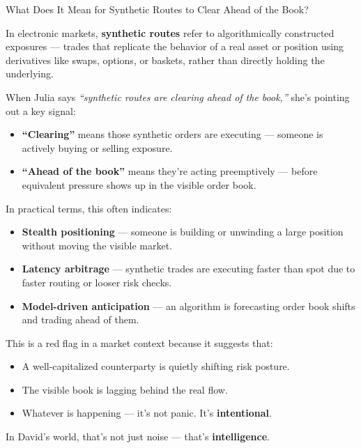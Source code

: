 \begin{TechnicalSidebar}{What Does It Mean for Synthetic Routes to Clear Ahead of the Book?}

  In electronic markets, \textbf{synthetic routes} refer to algorithmically constructed exposures — trades that 
  replicate the behavior of a real asset or position using derivatives like swaps, options, or baskets, rather 
  than directly holding the underlying.
  
  \medskip
  
  When Julia says \textit{“synthetic routes are clearing ahead of the book,”} she’s pointing out a key signal:
  
  \begin{itemize}
    \item \textbf{“Clearing”} means those synthetic orders are executing — someone is actively buying or selling 
    exposure.
    \item \textbf{“Ahead of the book”} means they’re acting preemptively — before equivalent pressure shows up in 
    the visible order book.
  \end{itemize}
  
  \medskip
  
  In practical terms, this often indicates:
  
  \begin{itemize}
    \item \textbf{Stealth positioning} — someone is building or unwinding a large position without moving the 
    visible market.
    \item \textbf{Latency arbitrage} — synthetic trades are executing faster than spot due to faster 
    routing or looser risk checks.
    \item \textbf{Model-driven anticipation} — an algorithm is forecasting order book shifts and trading 
    ahead of them.
  \end{itemize}
  
  \medskip
  
  This is a red flag in a market context because it suggests that:
  
  \begin{itemize}
    \item A well-capitalized counterparty is quietly shifting risk posture.
    \item The visible book is lagging behind the real flow.
    \item Whatever is happening — it’s not panic. It’s \textbf{intentional}.
  \end{itemize}
  
  \medskip
  
  In David’s world, that’s not just noise — that’s \textbf{intelligence}.
  
\end{TechnicalSidebar}

